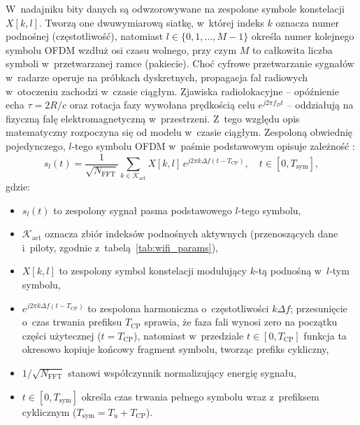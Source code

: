 W~nadajniku bity danych są odwzorowywane na zespolone symbole konstelacji $X[k,l]$. Tworzą one dwuwymiarową siatkę, w~której indeks $k$ oznacza numer podnośnej (częstotliwość), natomiast $l \in \{0, 1, \dots, M-1\}$ określa numer kolejnego symbolu OFDM wzdłuż osi czasu wolnego, przy czym $M$ to całkowita liczba symboli w~przetwarzanej ramce (pakiecie). Choć cyfrowe przetwarzanie sygnałów w~radarze operuje na próbkach dyskretnych, propagacja fal radiowych w~otoczeniu zachodzi w~czasie ciągłym. Zjawiska radiolokacyjne -- opóźnienie echa $\tau = 2R/c$ oraz rotacja fazy wywołana prędkością celu $e^{j 2\pi f_D t}$ -- oddziałują na fizyczną falę elektromagnetyczną w~przestrzeni. Z~tego względu opis matematyczny rozpoczyna się od modelu w~czasie ciągłym. Zespoloną obwiednię pojedynczego, $l$-tego symbolu OFDM w~paśmie podstawowym opisuje zależność \cite{braun2014}:
\begin{equation}
    s_l(t) = \frac{1}{\sqrt{N_{\mathrm{FFT}}}} \sum_{k \in \mathcal{K}_{\mathrm{act}}} X[k,l]\, e^{j 2\pi k \Delta f (t - T_{\mathrm{CP}})}, \quad t \in [0, T_{\mathrm{sym}}],
    \label{eq:ofdm_continuous}
\end{equation}
gdzie:
\begin{itemize}
    \item $s_l(t)$ to zespolony sygnał pasma podstawowego $l$-tego symbolu,
    \item $\mathcal{K}_{\mathrm{act}}$ oznacza zbiór indeksów podnośnych aktywnych (przenoszących dane i~piloty, zgodnie z~tabelą~\ref{tab:wifi_params}),
    \item $X[k,l]$ to zespolony symbol konstelacji modulujący $k$-tą podnośną w~$l$-tym symbolu,
    \item $e^{j 2\pi k \Delta f (t - T_{\mathrm{CP}})}$ to zespolona harmoniczna o~częstotliwości $k\Delta f$; przesunięcie o~czas trwania prefiksu $T_{\mathrm{CP}}$ sprawia, że faza fali wynosi zero na początku części użytecznej ($t = T_{\mathrm{CP}}$), natomiast w~przedziale $t \in [0, T_{\mathrm{CP}}]$ funkcja ta okresowo kopiuje końcowy fragment symbolu, tworząc prefiks cykliczny,
    \item $1/\sqrt{N_{\mathrm{FFT}}}$ stanowi współczynnik normalizujący energię sygnału,
    \item $t \in [0, T_{\mathrm{sym}}]$ określa czas trwania pełnego symbolu wraz z~prefiksem cyklicznym ($T_{\mathrm{sym}} = T_u + T_{\mathrm{CP}}$).
\end{itemize}

